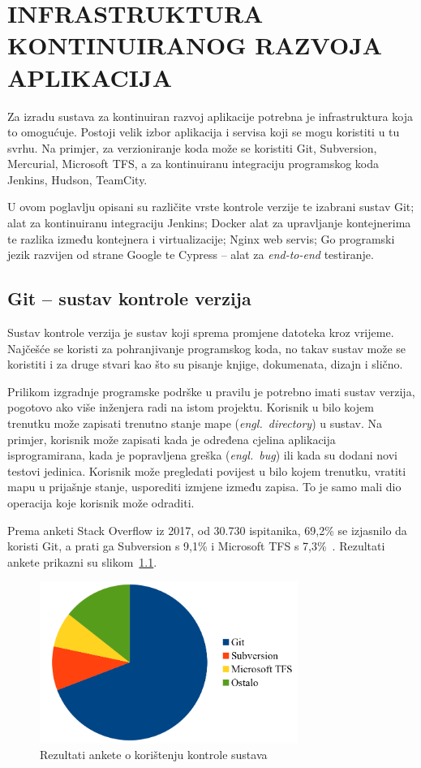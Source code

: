 \chapter{INFRASTRUKTURA KONTINUIRANOG RAZVOJA APLIKACIJA}
Za izradu sustava za kontinuiran razvoj aplikacije potrebna je infrastruktura koja to omogućuje.
Postoji velik izbor aplikacija i servisa koji se mogu koristiti u tu svrhu.  Na primjer, za
verzioniranje koda može se koristiti Git, Subversion, Mercurial, Microsoft TFS, a za kontinuiranu
integraciju programskog koda Jenkins, Hudson, TeamCity.

U ovom poglavlju opisani su različite vrste kontrole verzije te izabrani sustav Git; alat za
kontinuiranu integraciju Jenkins; Docker alat za upravljanje kontejnerima te razlika između
kontejnera i virtualizacije; Nginx web servis; Go programski jezik razvijen od strane Google te
Cypress -- alat za \textit{end-to-end} testiranje.

\section{Git -- sustav kontrole verzija}
Sustav kontrole verzija je sustav koji sprema promjene datoteka kroz vrijeme. Najčešće se koristi za
pohranjivanje programskog koda, no takav sustav može se koristiti i za druge stvari kao što su
pisanje knjige, dokumenata, dizajn i slično.

Prilikom izgradnje programske podrške u pravilu je potrebno imati sustav verzija, pogotovo ako više
inženjera radi na istom projektu. Korisnik u bilo kojem trenutku može zapisati trenutno stanje mape
(\textit{engl.~directory}) u sustav. Na primjer, korisnik može zapisati kada je određena cjelina
aplikacija isprogramirana, kada je popravljena greška (\textit{engl.~bug}) ili kada su dodani novi
testovi jedinica. Korisnik može pregledati povijest u bilo kojem trenutku, vratiti mapu u prijašnje
stanje, usporediti izmjene između zapisa. To je samo mali dio operacija koje korisnik može odraditi.

Prema anketi Stack Overflow iz 2017, od 30.730 ispitanika, 69,2\% se izjasnilo da koristi
Git, a prati ga Subversion s 9,1\% i Microsoft TFS s 7,3\%~\citep{StackOverflow2017Survey}.
Rezultati ankete prikazni su slikom~\ref{fig:02so_survey}.

\begin{figure}[h]
    \centering
    \includegraphics[width=0.75\textwidth]{img/02/so_survey.png}
    \caption{Rezultati ankete o korištenju kontrole sustava}%
    \label{fig:02so_survey}
\end{figure}


